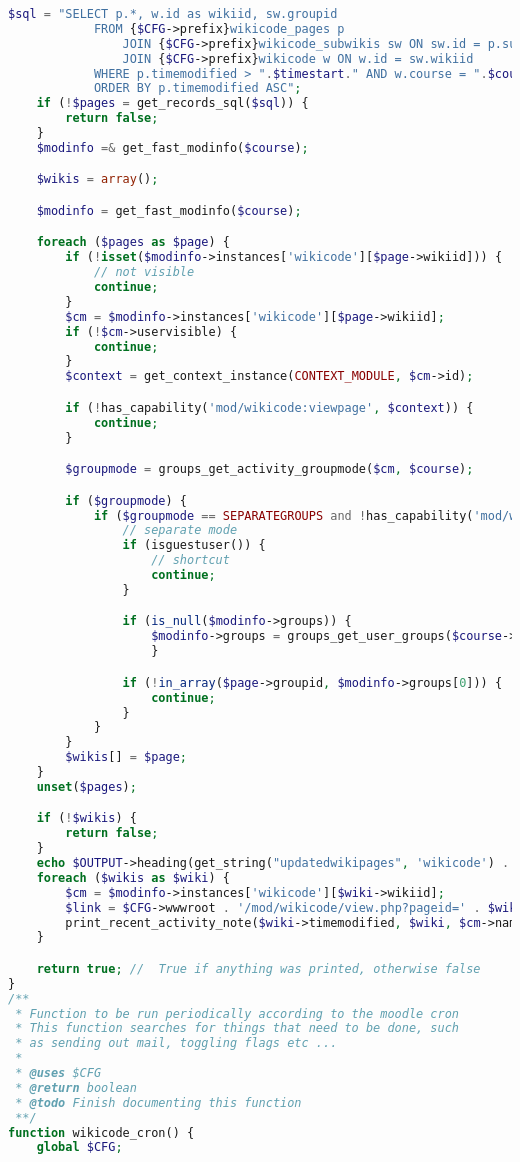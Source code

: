 \begin{lstlisting}[language=PHP]
    $sql = "SELECT p.*, w.id as wikiid, sw.groupid
            FROM {$CFG->prefix}wikicode_pages p
                JOIN {$CFG->prefix}wikicode_subwikis sw ON sw.id = p.subwikiid
                JOIN {$CFG->prefix}wikicode w ON w.id = sw.wikiid
            WHERE p.timemodified > ".$timestart." AND w.course = ".$course->id."
            ORDER BY p.timemodified ASC";
    if (!$pages = get_records_sql($sql)) {
        return false;
    }
    $modinfo =& get_fast_modinfo($course);

    $wikis = array();

    $modinfo = get_fast_modinfo($course);

    foreach ($pages as $page) {
        if (!isset($modinfo->instances['wikicode'][$page->wikiid])) {
            // not visible
            continue;
        }
        $cm = $modinfo->instances['wikicode'][$page->wikiid];
        if (!$cm->uservisible) {
            continue;
        }
        $context = get_context_instance(CONTEXT_MODULE, $cm->id);

        if (!has_capability('mod/wikicode:viewpage', $context)) {
            continue;
        }

        $groupmode = groups_get_activity_groupmode($cm, $course);

        if ($groupmode) {
            if ($groupmode == SEPARATEGROUPS and !has_capability('mod/wikicode:managewiki', $context)) {
                // separate mode
                if (isguestuser()) {
                    // shortcut
                    continue;
                }

                if (is_null($modinfo->groups)) {
                    $modinfo->groups = groups_get_user_groups($course->id); // load all my groups and cache it in modinfo
                    }

                if (!in_array($page->groupid, $modinfo->groups[0])) {
                    continue;
                }
            }
        }
        $wikis[] = $page;
    }
    unset($pages);

    if (!$wikis) {
        return false;
    }
    echo $OUTPUT->heading(get_string("updatedwikipages", 'wikicode') . ':', 3);
    foreach ($wikis as $wiki) {
        $cm = $modinfo->instances['wikicode'][$wiki->wikiid];
        $link = $CFG->wwwroot . '/mod/wikicode/view.php?pageid=' . $wiki->id;
        print_recent_activity_note($wiki->timemodified, $wiki, $cm->name, $link, false, $viewfullnames);
    }

    return true; //  True if anything was printed, otherwise false
}
/**
 * Function to be run periodically according to the moodle cron
 * This function searches for things that need to be done, such
 * as sending out mail, toggling flags etc ...
 *
 * @uses $CFG
 * @return boolean
 * @todo Finish documenting this function
 **/
function wikicode_cron() {
    global $CFG;


\end{lstlisting}
